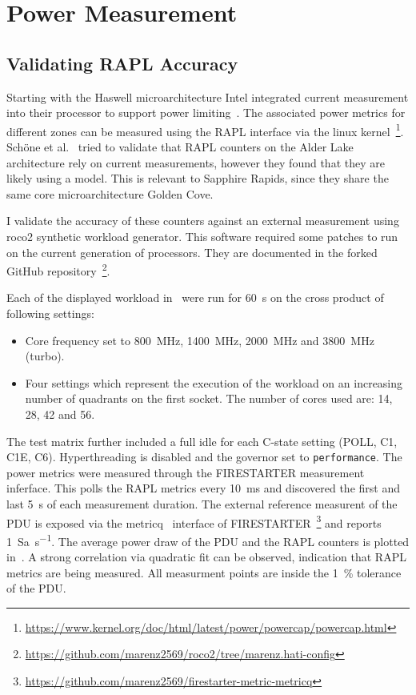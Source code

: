\chapter{Power Measurement}

\section{Validating RAPL Accuracy}
Starting with the Haswell microarchitecture Intel integrated current measurement into their processor to support power limiting~\cite{Hackenberg_2015_Haswell}.
The associated power metrics for different zones can be measured using the RAPL interface via the linux kernel~\footnote{\url{https://www.kernel.org/doc/html/latest/power/powercap/powercap.html}}.
Schöne et al.~\cite{Schoene_2024_Alder_Lake} tried to validate that RAPL counters on the Alder Lake architecture rely on current measurements, however they found that they are likely using a model.
This is relevant to Sapphire Rapids, since they share the same core microarchitecture Golden Cove.

I validate the accuracy of these counters against an external measurement using roco2 synthetic workload generator.
This software required some patches to run on the current generation of processors.
They are documented in the forked GitHub repository~\footnote{\url{https://github.com/marenz2569/roco2/tree/marenz.hati-config}}.

Each of the displayed workload in~ were run for \SI{60}{\second} on the cross product of following settings:
\begin{itemize}
    \item Core frequency set to \SI{800}{\MHz}, \SI{1400}{\MHz}, \SI{2000}{\MHz} and \SI{3800}{\MHz} (turbo).
    \item Four settings which represent the execution of the workload on an increasing number of quadrants on the first socket.
    The number of cores used are: \SI{14}{}, \SI{28}{}, \SI{42}{} and \SI{56}{}.
\end{itemize}
The test matrix further included a full idle for each C-state setting (POLL, C1, C1E, C6).
Hyperthreading is disabled and the governor set to \texttt{performance}.
The power metrics were measured through the FIRESTARTER measurement inferface.
This polls the RAPL metrics every \SI{10}{\ms} and discovered the first and last \SI{5}{\second} of each measurement duration.
The external reference measurent of the PDU is exposed via the metricq~\cite{Ilsche_2019_MetricQ} interface of FIRESTARTER~\footnote{\url{https://github.com/marenz2569/firestarter-metric-metricq}} and reports \SI{1}{Sa\per\second}.
The average power draw of the PDU and the RAPL counters is plotted in~.
A strong correlation via quadratic fit can be observed, indication that RAPL metrics are being measured.
All measurment points are inside the \SI{1}{\percent} tolerance of the PDU.

